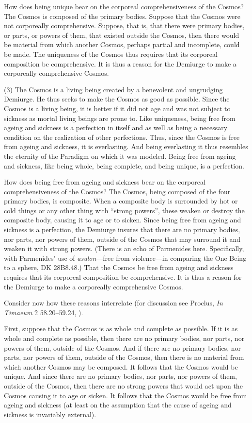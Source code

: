 How does being unique bear on the corporeal comprehensiveness of the Cosmos? The Cosmos is composed of the primary bodies. Suppose that the Cosmos were not corporeally comprehensive. Suppose, that is, that there were primary bodies, or parts, or powers of them, that existed outside the Cosmos, then there would be material from which another Cosmos, perhaps partial and incomplete, could be made. The uniqueness of the Cosmos thus requires that its corporeal composition be comprehensive.  It is thus a reason for the Demiurge to make a corporeally comprehensive Cosmos.

(3) The Cosmos is a living being created by a benevolent and ungrudging Demiurge. He thus seeks to make the Cosmos as good as possible. Since the Cosmos is a living being, it is better if it did not age and was not subject to sickness as mortal living beings are prone to. Like uniqueness, being free from ageing and sickness is a perfection in itself and as well as being a necessary condition on the realization of other perfections. Thus, since the Cosmos is free from ageing and sickness, it is everlasting. And being everlasting it thus resembles the eternity of the Paradigm on which it was modeled. Being free from ageing and sickness, like being whole, being complete, and being unique, is a perfection.

How does being free from ageing and sickness bear on the corporeal comprehensiveness of the Cosmos? The Cosmos, being composed of the four primary bodies, is composite. When a composite body is surrounded by hot or cold things or any other thing with ``strong powers'', these weaken or destroy the composite body, causing it to age or to sicken. Since being free from ageing and sickness is a perfection, the Demiurge insures that there are no primary bodies, nor parts, nor powers of them, outside of the Cosmos that may surround it and weaken it with strong powers. (There is an echo of Parmenides here. Specifically, with Parmenides' use of \emph{asulon}---free from violence---in comparing the One Being to a sphere, DK 28B8.48.) That the Cosmos be free from ageing and sickness requires that its corporeal composition be comprehensive. It is thus a reason for the Demiurge to make a corporeally comprehensive Cosmos.

Consider now how these reasons interrelate (for discussion see Proclus, \emph{In Timaeum} 2 58.20--59.24, \citealt{Diehl:1903re}). 

First, suppose that the Cosmos is as whole and complete as possible. If it is as whole and complete as possible, then there are no primary bodies, nor parts, nor powers of them, outside of the Cosmos. And if there are no primary bodies, nor parts, nor powers of them, outside of the Cosmos, then there is no material from which another Cosmos may be composed. It follows that the Cosmos would be unique. And since there are no primary bodies, nor parts, nor powers of them, outside of the Cosmos, then there are no strong powers that would act upon the Cosmos causing it to age or sicken. It follows that the Cosmos would be free from ageing and sickness (at least on the assumption that the cause of ageing and sickness is invariably external).

